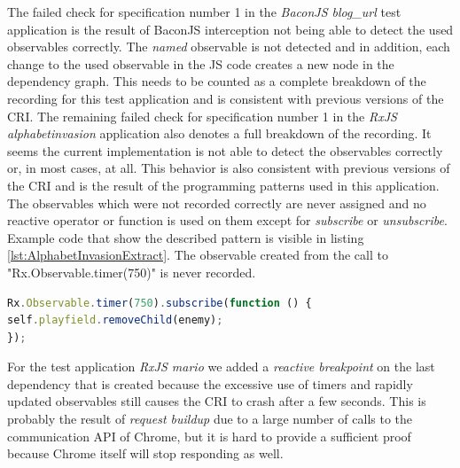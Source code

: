 The failed check for specification number 1 in the \emph{BaconJS blog\_url} test application is the result of BaconJS interception not being able to detect the used observables correctly. The \emph{named} observable is not detected and in addition, each change to the used observable in the JS code creates a new node in the dependency graph. This needs to be counted as a complete breakdown of the recording for this test application and is consistent with previous versions of the CRI. The remaining failed check for specification number 1 in the \emph{RxJS alphabetinvasion} application also denotes a full breakdown of the recording. It seems the current implementation is not able to detect the observables correctly or, in most cases, at all. This behavior is also consistent with previous versions of the CRI and is the result of the programming patterns used in this application. The observables which were not recorded correctly are never assigned and no reactive operator or function is used on them except for \emph{subscribe} or \emph{unsubscribe}. Example code that show the described pattern is visible in listing \ref{lst:AlphabetInvasionExtract}. The observable created from the call to "Rx.Observable.timer(750)" is never recorded.

\begin{lstlisting}[language=JavaScript, caption={Extract of RxJS AlphabetInvasion test application.},label={lst:AlphabetInvasionExtract}]
Rx.Observable.timer(750).subscribe(function () {
self.playfield.removeChild(enemy);
});	
\end{lstlisting}

For the test application \emph{RxJS mario} we added a \emph{reactive breakpoint} on the last dependency that is created because the excessive use of timers and rapidly updated observables still causes the CRI to crash after a few seconds. This is probably the result of \emph{request buildup} due to a large number of calls to the communication API of Chrome, but it is hard to provide a sufficient proof because Chrome itself will stop responding as well.

